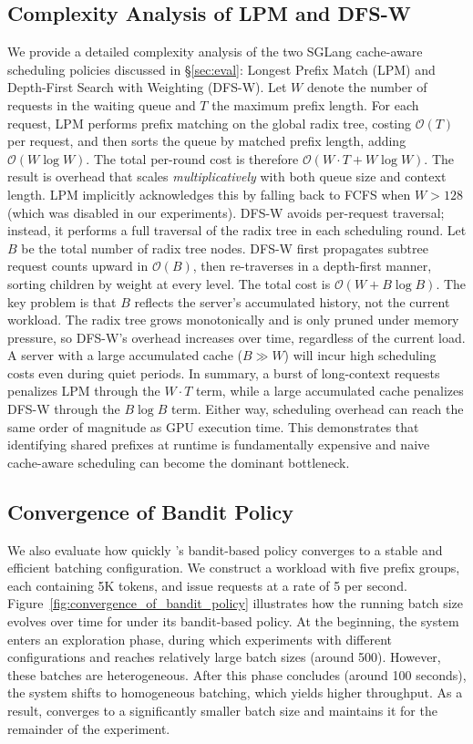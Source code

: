 \subsection{Complexity Analysis of LPM and DFS-W}
\label{subsec:scheduling-complexity}
We provide a detailed complexity analysis of the two SGLang cache-aware scheduling policies discussed in \S\ref{sec:eval}: Longest Prefix Match (LPM) and Depth-First Search with Weighting (DFS-W). Let $W$ denote the number of requests in the waiting queue and $T$ the maximum prefix length. For each request, LPM performs prefix matching on the global radix tree, costing $\mathcal{O}(T)$ per request, and then sorts the queue by matched prefix length, adding $\mathcal{O}(W \log W)$. The total per-round cost is therefore $\mathcal{O}(W \cdot T + W \log W)$. The result is overhead that scales \textit{multiplicatively} with both queue size and context length. LPM implicitly acknowledges this by falling back to FCFS when $W > 128$ (which was disabled in our experiments). DFS-W avoids per-request traversal; instead, it performs a full traversal of the radix tree in each scheduling round. Let $B$ be the total number of radix tree nodes. DFS-W first propagates subtree request counts upward in $\mathcal{O}(B)$, then re-traverses in a depth-first manner, sorting children by weight at every level. The total cost is $\mathcal{O}(W + B \log B)$. The key problem is that $B$ reflects the server's accumulated history, not the current workload. The radix tree grows monotonically and is only pruned under memory pressure, so DFS-W's overhead increases over time, regardless of the current load. A server with a large accumulated cache ($B \gg W$) will incur high scheduling costs even during quiet periods. In summary, a burst of long-context requests penalizes LPM through the $W \cdot T$ term, while a large accumulated cache penalizes DFS-W through the $B \log B$ term. Either way, scheduling overhead can reach the same order of magnitude as GPU execution time. This demonstrates that identifying shared prefixes at runtime is fundamentally expensive and naive cache-aware scheduling can become the dominant bottleneck.

\subsection{Convergence of Bandit Policy}
\label{subsec:convergence_of_bandit_policy}
We also evaluate how quickly \Feather's bandit-based policy converges to a stable and efficient batching configuration. We construct a workload with five prefix groups, each containing 5K tokens, and issue requests at a rate of 5 per second. Figure~\ref{fig:convergence_of_bandit_policy} illustrates how the running batch size evolves over time for \Feather under its bandit-based policy. At the beginning, the system enters an exploration phase, during which \Feather experiments with different configurations and reaches relatively large batch sizes (around 500). However, these batches are heterogeneous. After this phase concludes (around 100 seconds), the system shifts to homogeneous batching, which yields higher throughput. As a result, \Feather converges to a significantly smaller batch size and maintains it for the remainder of the experiment.


